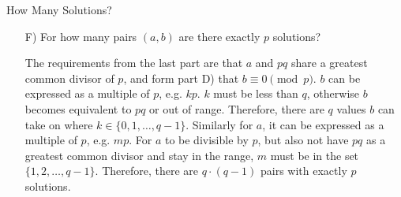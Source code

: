 \begin{homeworkProblem}{How Many Solutions?}
\begin{itemize}
        \item[F)] For how many pairs $(a,b)$ are there exactly $p$ solutions? 
        
        The requirements from the last part are that $a$ and $pq$ share a greatest 
        common divisor of $p$, and form part D) that $b \equiv 0 \pmod{p}$. $b$
        can be expressed as a multiple of $p$, e.g. $kp$. $k$ must be less than
        $q$, otherwise $b$ becomes equivalent to $pq$ or out of range. Therefore,
        there are $q$ values $b$ can take on where $k \in \{ 0, 1, \dots, q-1 \}$.
        Similarly for $a$, it can be expressed as a multiple of $p$, e.g. $mp$.
        For $a$ to be divisible by $p$, but also not have $pq$ as a greatest
        common divisor and stay in the range, $m$ must be in the set $\{ 1, 2, \dots, q-1 \}$.
        Therefore, there are $q \cdot (q-1)$ pairs with exactly $p$ solutions.


    \end{itemize}
    
\end{homeworkProblem}